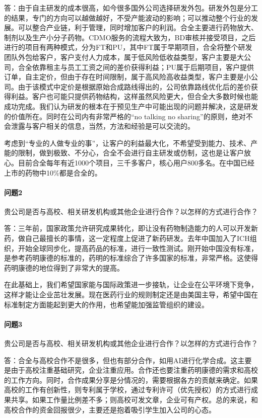 \documentclass[twocolumn]{ctexbook}
\begin{document}
	答：由于自主研发的成本很高，如今很多国外公司选择研发外包。研发外包是分工的结果，专门的方向可以越做越好，不受产能波动的影响；可以推动整个行业的发展。可以整合产业链，利于管理，同时增加客户的利润。合全主要进行药物放大、制剂以及生产小分子药物。CDMO服务的流程大致为，BD审核并接受项目，之后进行的项目有两种模式，分为FT和PU，其中FT属于早期项目，合全将整个研发团队外包给客户，客户支付人力成本，属于低风险低收益类型，客户主要是大公司，合全依靠租主与员工工资之间的差价获得利益；PU属于后期项目，客户提供订单，自主定价，但由于存在时间限制，属于高风险高收益类型，客户主要是小公司。由于该模式中定价是根据原始合成路线得出的，公司依靠路线优化后的差价获得利益。客户也可能只提供药物结构，这样虽然风险更大，但合全大多数时候也能成功完成。我们认为研发的根本在于预见生产中可能出现的问题并解决，这是研发的价值所在。同时在公司内有非常严格的“no talking no sharing”的原则，绝对不会泄露与客户相关的信息，当然，方法和经验是可以交流的。
	
	考虑到“专业的人做专业的事”，让客户的利益最大化，不希望受到能力、技术、产能的限制，做到极致、不分心，合全不会进行自主研发或仿制，这也是让客户放心。目前合全每年有近1000个项目，三千多客户，核心用户800多名。在中国已经上市的药物中10\%都是合全的。
	
	\paragraph{问题2}贵公司是否与高校、相关研发机构或其他企业进行合作？以怎样的方式进行合作？
	
	答：三年前，国家政策允许研究成果转化，即让没有药物制造能力的人可以开发新药，做自己最擅长的事情，这一定程度上促进了新药研发。去年中国加入了ICH组织，开始全球同步化，提高药品的标准，进行一致性测试。刚开始中国没有标准，是参考药明康德的标准的，药明的标准综合了许多国家的标准，非常严格。这使得药明康德的地位得到了非常大的提高。
	
	在此基础上，我们希望国家能与国际政策进一步接轨，让企业在公平环境下竞争，这样才能让企业茁壮发展。现在医药行业的规则制定还是由美国主导，希望中国在标准制定方面能起到更大的作用，也希望能加强监管组织的建设。
	
	\paragraph{问题3}贵公司是否与高校、相关研发机构或其他企业进行合作？以怎样的方式进行合作？
	
	答：合全与高校合作不是很多，但也有部分合作，如用AI进行化学合成。这主要是由于高校注重基础研究，企业注重应用。合作还也要注重药明康德的需求和高校的工作方向。同时，合作成果分享是分情况的，需要根据各方的贡献来确定。如果高校的工作有创新性，则专利属于学校，通过专利许可（优先授权）的方式进行成果共享。如果工作量比例差不多；则高校可发文章，企业可有产权。总的来说，和高校合作的资金回报很少，主要还是抱着吸引学生加入公司的心态。
	
\end{document}
